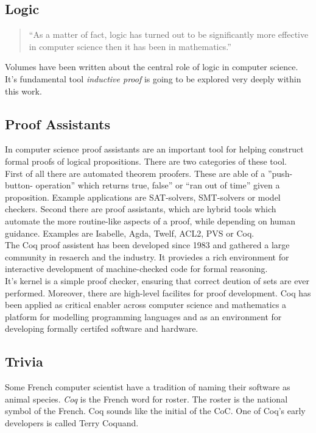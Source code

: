 \subsection{Logic}

\begin{quote}
``As a matter of fact, logic has turned out to be significantly more effective in computer science then it has been in mathematics.''
\end{quote}
Volumes have been written about the central role of logic in computer science. 
It's fundamental tool {\itshape inductive proof} is going to be explored very deeply within this work.

\subsection{Proof Assistants}
In computer science proof assistants are an important tool for helping construct formal proofs of logical propositions.
There are two categories of these tool.\\
First of all there are automated theorem proofers. 
These are able of a ''push-button- operation'' which returns true, false'' or ``ran out of time'' given a proposition.
Example applications are SAT-solvers, SMT-solvers or model checkers. 
Second there are proof assistants, which are hybrid tools which automate the more routine-like aspects of a proof, while depending on human guidance. 
Examples are \gls{Isabelle}, Agda, Twelf, ACL2, PVS or Coq.\\
The Coq proof assistent has been developed since 1983 and gathered a large community in resaerch and the industry.
It proviedes a rich environment for interactive development of machine-checked code for formal reasoning.\\
It's kernel is a simple proof checker, ensuring that correct deution of sets are ever performed. 
Moreover, there are high-level facilites for proof development.
Coq has been applied as critical enabler across computer science and mathematics a platform for modelling programming languages and as an environment for developing formally certifed software and hardware.
 

\subsection{Trivia}
Some French computer scientist have a tradition of naming their software as animal species.
{\itshape Coq} is the French word for roster.
The roster is the national symbol of the French.
Coq sounds like the initial of the \gls{CoC}.
One of Coq's early developers is called Terry Coquand.

